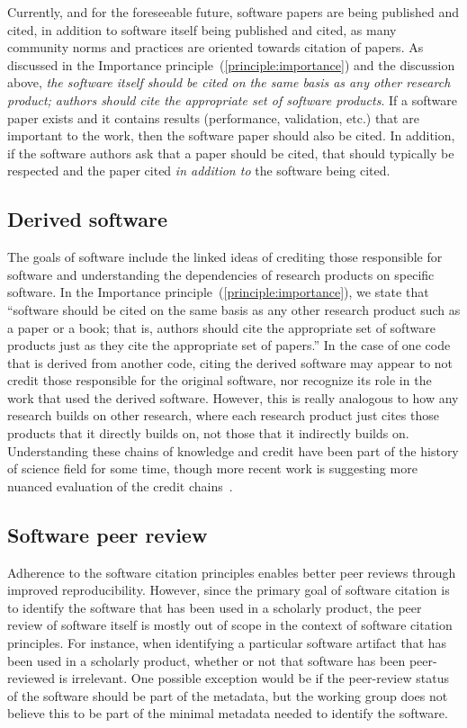 \documentclass[11pt, oneside]{amsart}
\begin{document}
Currently, and for the foreseeable future, software papers are being published and cited,
in addition to software itself being published and cited, as many community norms and practices are
oriented towards citation of papers.
As discussed in the Importance principle~(\ref{principle:importance}) and the discussion above, \textit{the software
itself should be cited on the same basis as any other research product; authors should cite the appropriate set of software products}.
If a software paper exists and it contains results (performance, validation, etc.) that are
important to the work, then the software paper should also be cited.
In addition, if the software authors ask that a paper should be cited, that should typically be respected and the paper cited \textit{in addition to} the software being cited.

\subsection{Derived software}

The goals of software include the linked ideas of crediting those responsible for software and understanding the dependencies of research products on specific software.
In the Importance principle~(\ref{principle:importance}), we state that
``software should be cited on the same basis as any other research product such as a paper or a book; that is, authors should cite the appropriate set of software products just as they cite the appropriate set of papers.''
In the case of one code that is derived from another code, citing the derived software may appear to not credit those responsible for the original software, nor recognize its role in the work that used the derived software.
However, this is really analogous to how any research builds on other research, where each research product just cites those products that it directly builds on, not those that it indirectly builds on.
Understanding these chains of knowledge and credit have been part of the history of science field for some time, though more recent work is suggesting more nuanced evaluation of the credit chains~\cite{casrai-credit, transitive_credit_json-ld}.

\subsection{Software peer review}

Adherence to the software citation principles enables better peer reviews through improved
reproducibility. However, since the primary goal of software citation is to identify the
software that has been used in a scholarly product, the peer review of software itself is
mostly out of scope in the context of software citation principles. For instance, when
identifying a particular software artifact that has been used in a scholarly product,
whether or not that software has been peer-reviewed is irrelevant. One possible exception
would be if the peer-review status of the software should
be part of the metadata, but the working group does not believe this to be part of the
minimal metadata needed to identify the software.
\end{document}
